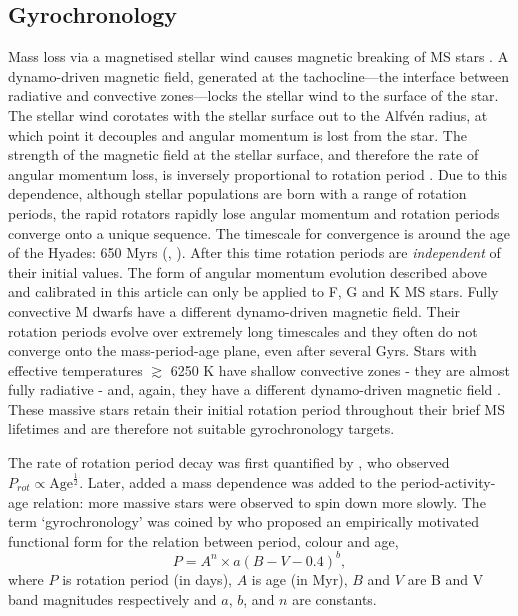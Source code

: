 \documentclass[10pt,preprint]{aastex}
\begin{document}
\subsection{Gyrochronology}

Mass loss via a magnetised stellar wind causes magnetic breaking of MS stars \citep{Weber1967}.
A dynamo-driven magnetic field, generated at the tachocline---the interface between radiative and convective zones---locks the stellar wind to the surface of the star.
The stellar wind corotates with the stellar surface out to the Alfv\'{e}n radius, at which point it decouples and angular momentum is lost from the star.
The strength of the magnetic field at the stellar surface, and therefore the rate of angular momentum loss, is inversely proportional to rotation period \citep{Kawaler1988}.
Due to this dependence, although stellar populations are born with a range of rotation periods, the rapid rotators rapidly lose angular momentum and rotation periods converge onto a unique sequence.
The timescale for convergence is around the age of the Hyades: 650 Myrs (\citealt{Radick1987}, \citealt{Irwin2009}).
After this time rotation periods are \emph{independent} of their initial values.
The form of angular momentum evolution described above and calibrated in this article can only be applied to F, G and K MS stars.
Fully convective M dwarfs have a different dynamo-driven magnetic field.
Their rotation periods evolve over extremely long timescales and they often do not converge onto the mass-period-age plane, even after several Gyrs.
Stars with effective temperatures $\gtrsim$ 6250 K have shallow convective zones - they are almost fully radiative - and, again, they have a different dynamo-driven magnetic field \citep{Kraft1967}.
These massive stars retain their initial rotation period throughout their brief MS lifetimes and are therefore not suitable gyrochronology targets.

The rate of rotation period decay was first quantified by \citet{Skumanich1972}, who observed $P_{rot} \propto \mathrm{Age}^{\frac{1}{2}}$.
Later, \citet{Noyes1984_2} added a mass dependence was added to the period-activity-age relation: more massive stars were observed to spin down more slowly.
The term `gyrochronology' was coined by \citet{Barnes2003} who proposed an empirically motivated functional form for the relation between period, colour and age,
\begin{equation}
P = A^n \times a(B-V-0.4)^b,
\label{eq:Barnes2007_2}
\end{equation}
where $P$ is rotation period (in days), $A$ is age (in Myr), $B$ and $V$ are B and V band magnitudes respectively and $a$, $b$, and $n$ are constants.
\end{document}
